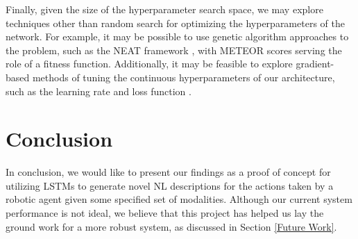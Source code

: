 \documentclass[letterpaper, 12 pt, conference]{ieeeconf}
\begin{document}
Finally, given the size of the hyperparameter search space, we may explore techniques other than random search for optimizing the hyperparameters of the network. For example, it may be possible to use genetic algorithm approaches to the problem, such as the NEAT framework \cite{rawalevolving,stanley2002evolving}, with METEOR scores serving the role of a fitness function. Additionally, it may be feasible to explore gradient-based methods of tuning the continuous hyperparameters of our architecture, such as the learning rate and loss function \cite{maclaurin2015gradient}.  

\section{Conclusion}

In conclusion, we would like to present our findings as a proof of concept for utilizing LSTMs to generate novel NL descriptions for the actions taken by a robotic agent given some specified set of modalities. Although our current system performance is not ideal, we believe that this project has helped us lay the ground work for a more robust system, as discussed in Section \ref{Future Work}.

%



\onecolumn
\end{document}
